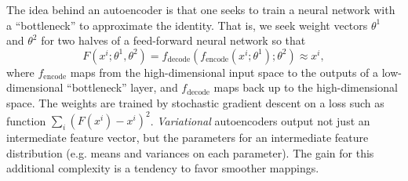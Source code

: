 \documentclass[12pt, leqno]{article} %
\begin{document}
The idea behind an autoencoder is that one seeks to train a neural
network with a ``bottleneck'' to approximate the identity.  That is,
we seek weight vectors $\theta^1$ and $\theta^2$ for two halves of a
feed-forward neural network so that
\[
  F(x^i; \theta^1, \theta^2) = 
  f_{\mathrm{decode}}(f_{\mathrm{encode}}(x^i; \theta^1); \theta^2)
  \approx x^i,
\]
where $f_{\mathrm{encode}}$ maps from the high-dimensional input space
to the outputs of a low-dimensional ``bottleneck'' layer,
and $f_{\mathrm{decode}}$ maps back up to the high-dimensional space.
The weights are trained by stochastic gradient descent on a loss such as
function $\sum_i (F(x^i)-x^i)^2$.  {\em Variational} autoencoders
output not just an intermediate feature vector, but the parameters for
an intermediate feature distribution (e.g. means and variances on each
parameter).  The gain for this additional complexity is a tendency to
favor smoother mappings.
\end{document}
